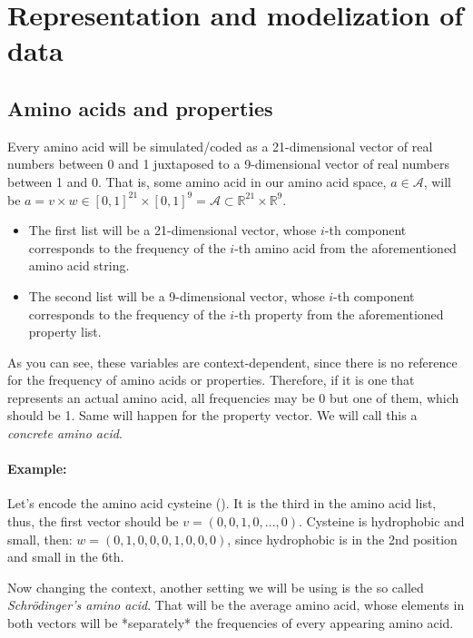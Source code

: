 \section{Representation and modelization of data}

\subsection{Amino acids and properties}
Every amino acid will be simulated/coded as a 21-dimensional vector of real numbers between 0 and 1 juxtaposed to a 9-dimensional vector of real numbers between 1 and 0. 
That is, some amino acid in our amino acid space, $a\in\mathcal A$, will be $a=v \times w\in[0,1]^{21}\times[0,1]^{9}=\mathcal A\subset \mathbb R^{21}\times\mathbb R^{9}$.

\begin{itemize}
    \item The first list will be a 21-dimensional vector, whose $i$-th component corresponds to the frequency of the $i$-th amino acid from the aforementioned amino acid string.
    \item The second list will be a 9-dimensional vector, whose $i$-th component corresponds to the frequency of the $i$-th property from the aforementioned property list.
\end{itemize}

As you can see, these variables are context-dependent, since there is no reference for the frequency of amino acids or properties. Therefore, if it is one that represents an actual amino acid, all frequencies may be 0 but one of them, which should be 1. Same will happen for the property vector. We will call this a \textit{concrete amino acid}.

\paragraph{Example:} Let's encode the amino acid cysteine (\code{\textcolor{green!70!black}{C}}). It is the third in the amino acid list, thus, the first vector should be $v = (0,0,1,0,...,0)$. Cysteine is hydrophobic and small, then: $w= (0,1,0,0,0,1,0,0,0)$, since hydrophobic is in the 2nd position and small in the 6th.

Now changing the context, another setting we will be using is the so called \textit{Schrödinger's amino acid}. That will be the average amino acid, whose elements in both vectors will be *separately* the frequencies of every appearing amino acid.

